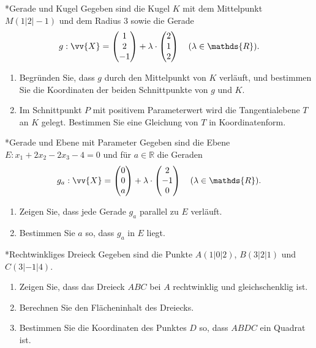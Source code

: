\begin{uebung}*{Gerade und Kugel}
Gegeben sind die Kugel $K$ mit dem Mittelpunkt $M(1|2|-1)$ und dem Radius $3$ sowie die Gerade
\[g: \vv{X} = \begin{pmatrix} 1\\ 2\\ -1\end{pmatrix}+\lambda\cdot\begin{pmatrix} 2\\ 1\\ 2\end{pmatrix}\quad(\lambda\in\mathds{R}).\]
\begin{enumerate}[label=\alph*)]
  \item Begründen Sie, dass $g$ durch den Mittelpunkt von $K$ verläuft, und bestimmen Sie die Koordinaten der beiden Schnittpunkte von $g$ und $K$.
  \item Im Schnittpunkt $P$ mit positivem Parameterwert wird die Tangentialebene $T$ an $K$ gelegt. Bestimmen Sie eine Gleichung von $T$ in Koordinatenform.
\end{enumerate}
\end{uebung}

\begin{uebung}*{Gerade und Ebene mit Parameter}
Gegeben sind die Ebene $E: x_1+2x_2-2x_3-4=0$ und für $a\in\mathds{R}$ die Geraden
\[g_a: \vv{X} = \begin{pmatrix} 0\\ 0\\ a\end{pmatrix}+\lambda\cdot\begin{pmatrix} 2\\ -1\\ 0\end{pmatrix}\quad(\lambda\in\mathds{R}).\]
\begin{enumerate}[label=\alph*)]
  \item Zeigen Sie, dass jede Gerade $g_a$ parallel zu $E$ verläuft.
  \item Bestimmen Sie $a$ so, dass $g_a$ in $E$ liegt.
\end{enumerate}
\end{uebung}

\begin{uebung}*{Rechtwinkliges Dreieck}
Gegeben sind die Punkte $A(1|0|2)$, $B(3|2|1)$ und $C(3|-1|4)$.
\begin{enumerate}[label=\alph*)]
  \item Zeigen Sie, dass das Dreieck $ABC$ bei $A$ rechtwinklig und gleichschenklig ist.
  \item Berechnen Sie den Flächeninhalt des Dreiecks.
  \item Bestimmen Sie die Koordinaten des Punktes $D$ so, dass $ABDC$ ein Quadrat ist.
\end{enumerate}
\end{uebung}

